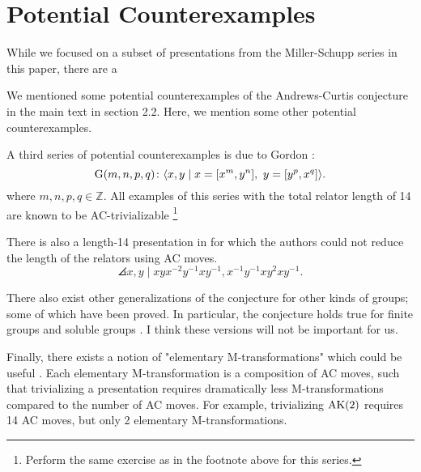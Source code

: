 
\section{Potential Counterexamples}

While we focused on a subset of presentations from the Miller-Schupp series in this paper, there are a 

We mentioned some potential counterexamples of the Andrews-Curtis conjecture in the main text in section 2.2. Here, we mention some other potential counterexamples. 

A third series of potential counterexamples is due to Gordon \cite{Brown}:
\[
\text{G}(m, n, p, q) \colon \langle x, y \mid x = [x^m, y^n],\ y = [y^p, x^q]\rangle.
\]
where $m,n,p,q \in \mathbb{Z}$.
All examples of this series with the total relator length of 14 are known
to be AC-trivializable \cite{Bowman-McCaul}
\footnote{Perform the same exercise as in the footnote above for this series.}
\newline

There is also a length-14 presentation in \cite{MMS} for which the authors could not reduce the length of the relators using AC moves.
\[
\angles{x, y \mid xyx^{-2}y^{-1} xy^{-1}, x^{-1} y^{-1} x y^2 x y^{-1}}.
\]


There also exist other generalizations of the conjecture for other kinds of groups; some of which have been proved.
In particular, the conjecture holds true for finite groups and soluble groups \cite{Borovik, Guyot}.
I think these versions will not be important for us.
\newline

Finally, there exists a notion of "elementary M-transformations" which could be useful \cite{BurnsI, BurnsII}.
Each elementary M-transformation is a composition of AC moves, such that trivializing a presentation requires dramatically less M-transformations compared to the number of AC moves.
For example, trivializing $\text{AK}(2)$ requires 14 AC moves, but only 2 elementary M-transformations.
